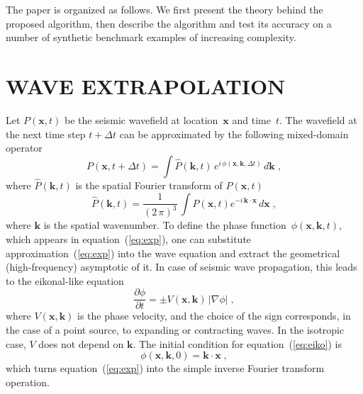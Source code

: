 The paper is organized as follows. We first present the theory behind
the proposed algorithm, then describe the algorithm and test its
accuracy on a number of synthetic benchmark examples of increasing
complexity.

\section{WAVE EXTRAPOLATION}

\newcommand{\x}{\mathbf{x}}
\renewcommand{\k}{\mathbf{k}}
\newcommand{\eps}{\varepsilon}

Let $P(\x,t)$ be the seismic wavefield at
location~$\x$ and time~$t$. The wavefield at the next time
step $t+\Delta t$ can be approximated by the following mixed-domain
operator \cite[]{wards}
\begin{equation}
  \label{eq:exp}
  P(\x,t+\Delta t) = \int
  \widehat{P}(\k,t)\,e^{i\,\phi(\x,\k,\Delta t)}\,d\k\;,
\end{equation}
where $\widehat{P}(\k,t)$ is the spatial Fourier transform of $P(\x,t)$
\begin{equation}
  \label{eq:ft}
  \widehat{P}(\k,t) = \frac{1}{(2\,\pi)^3}\,\int P(\x,t) e^{-i\,\k \cdot \x}\,
  d\x\;,
\end{equation}
where $\k$ is the spatial wavenumber.
To define the phase function~$\phi(\x,\k,t)$, which appears in
equation~(\ref{eq:exp}), one can substitute
approximation~(\ref{eq:exp}) into the wave equation and extract the
geometrical (high-frequency) asymptotic of it. In case of seismic
wave propagation, this leads to the eikonal-like equation
\begin{equation}
  \label{eq:eiko}
  \frac{\partial \phi}{\partial t} = \pm V(\x,\k)\,\left|\nabla \phi\right|\;,
\end{equation}
where $V(\x,\k)$ is the phase velocity, and the choice of the sign
corresponds, in the case of a point source, to expanding or
contracting waves. In the isotropic case, $V$ does not depend on
$\k$. The initial condition for equation~(\ref{eq:eiko}) is
\begin{equation}
  \label{eq:ic}
  \phi(\x,\k,0) = \k \cdot \x\;,
\end{equation}
which turns equation~(\ref{eq:exp}) into the simple inverse Fourier transform operation.

